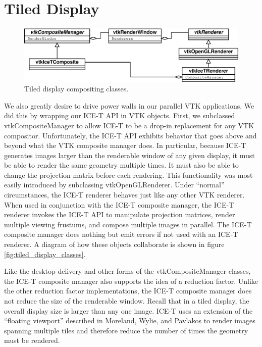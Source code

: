 \documentclass[twocolumn]{article}
\begin{document}
\section{Tiled Display}
\label{sec:tiled_display}

\begin{figure}
  \begin{center}
    \includegraphics[scale=0.23]{images/IceTCompositeClasses}
  \end{center}
  \caption{Tiled display compositing classes.}
  \label{fig:tiled_display_classes}
\end{figure}

We also greatly desire to drive power walls in our parallel VTK
applications.  We did this by wrapping our ICE-T API in VTK objects.
First, we subclassed vtkCompositeManager to allow ICE-T to be a drop-in
replacement for any VTK compositor.  Unfortunately, the ICE-T API exhibits
behavior that goes above and beyond what the VTK composite manager does.
In particular, because ICE-T generates images larger than the renderable
window of any given display, it must be able to render the same geometry
multiple times.  It must also be able to change the projection matrix
before each rendering.  This functionality was most easily introduced by
subclassing vtkOpenGLRenderer.  Under ``normal'' circumstances, the ICE-T
renderer behaves just like any other VTK renderer.  When used in
conjunction with the ICE-T composite manager, the ICE-T renderer invokes
the ICE-T API to manipulate projection matrices, render multiple viewing
frustums, and compose multiple images in parallel.  The ICE-T composite
manager does nothing but emit errors if not used with an ICE-T renderer.  A
diagram of how these objects collaborate is shown in figure
\vref{fig:tiled_display_classes}.

Like the desktop delivery and other forms of the vtkCompositeManager
classes, the ICE-T composite manager also supports the idea of a reduction
factor.  Unlike the other reduction factor implementations, the ICE-T
composite manager does not reduce the size of the renderable window.
Recall that in a tiled display, the overall display size is larger than any
one image.  ICE-T uses an extension of the ``floating viewport'' described
in Moreland, Wylie, and Pavlakos \cite{Moreland01} to render images
spanning multiple tiles and therefore reduce the number of times the
geometry must be rendered.
\end{document}
